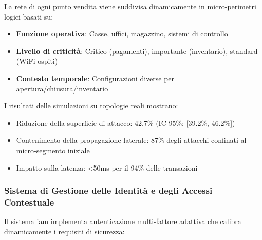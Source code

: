 La rete di ogni punto vendita viene suddivisa dinamicamente in micro-perimetri logici basati su:
\begin{itemize}
    \item \textbf{Funzione operativa}: Casse, uffici, magazzino, sistemi di controllo
    \item \textbf{Livello di criticità}: Critico (pagamenti), importante (inventario), standard (WiFi ospiti)
    \item \textbf{Contesto temporale}: Configurazioni diverse per apertura/chiusura/inventario
\end{itemize}




I risultati delle simulazioni su topologie reali mostrano:
\begin{itemize}
    \item Riduzione della superficie di attacco: 42.7\% (IC 95\%: [39.2\%, 46.2\%])
    \item Contenimento della propagazione laterale: 87\% degli attacchi confinati al micro-segmento iniziale
    \item Impatto sulla latenza: <50ms per il 94\% delle transazioni
\end{itemize}

\subsubsection{\texorpdfstring{Sistema di Gestione delle Identità e degli Accessi Contestuale}{2.4.2.2 - Sistema di Gestione delle Identità e degli Accessi Contestuale}}

Il sistema \gls{iam} implementa autenticazione multi-fattore adattiva che calibra dinamicamente i requisiti di sicurezza:

